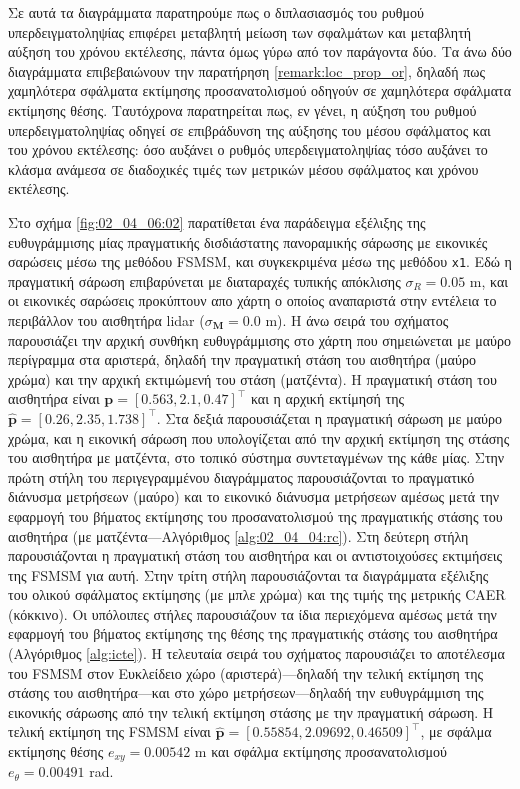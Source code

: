 Σε αυτά τα διαγράμματα παρατηρούμε πως ο διπλασιασμός του ρυθμού
υπερδειγματοληψίας επιφέρει μεταβλητή μείωση των σφαλμάτων και μεταβλητή αύξηση
του χρόνου εκτέλεσης, πάντα όμως γύρω από τον παράγοντα δύο. Τα άνω δύο
διαγράμματα επιβεβαιώνουν την παρατήρηση \ref{remark:loc_prop_or}, δηλαδή πως
χαμηλότερα σφάλματα εκτίμησης προσανατολισμού οδηγούν σε χαμηλότερα σφάλματα
εκτίμησης θέσης. Ταυτόχρονα παρατηρείται πως, εν γένει, η αύξηση του ρυθμού
υπερδειγματοληψίας οδηγεί σε επιβράδυνση της αύξησης του μέσου σφάλματος και
του χρόνου εκτέλεσης: όσο αυξάνει ο ρυθμός υπερδειγματοληψίας τόσο  αυξάνει το
κλάσμα ανάμεσα σε διαδοχικές τιμές των μετρικών μέσου σφάλματος και χρόνου
εκτέλεσης.


Στο σχήμα \ref{fig:02_04_06:02} παρατίθεται ένα παράδειγμα εξέλιξης της
ευθυγράμμισης μίας πραγματικής δισδιάστατης πανοραμικής σάρωσης με εικονικές
σαρώσεις μέσω της μεθόδου FSMSM, και συγκεκριμένα μέσω της μεθόδου \texttt{x1}.
Εδώ η πραγματική σάρωση επιβαρύνεται με διαταραχές τυπικής απόκλισης $\sigma_R
= 0.05$ m, και οι εικονικές σαρώσεις προκύπτουν απο χάρτη ο οποίος αναπαριστά
στην εντέλεια το περιβάλλον του αισθητήρα lidar ($\sigma_{\bm{M}} = 0.0$ m). Η
άνω σειρά του σχήματος παρουσιάζει την αρχική συνθήκη ευθυγράμμισης στο χάρτη
που σημειώνεται με μαύρο περίγραμμα στα αριστερά, δηλαδή την πραγματική στάση
του αισθητήρα (μαύρο χρώμα) και την αρχική εκτιμώμενή του στάση (ματζέντα). Η
πραγματική στάση του αισθητήρα είναι $\bm{p} = [0.563, 2.1, 0.47]^\top$ και η
αρχική εκτίμησή της $\hat{\bm{p}} = [0.26, 2.35, 1.738]^\top$. Στα δεξιά
παρουσιάζεται η πραγματική σάρωση με μαύρο χρώμα, και η εικονική σάρωση που
υπολογίζεται από την αρχική εκτίμηση της στάσης του αισθητήρα με ματζέντα, στο
τοπικό σύστημα συντεταγμένων της κάθε μίας. Στην πρώτη στήλη του
περιγεγραμμένου διαγράμματος παρουσιάζονται το πραγματικό διάνυσμα μετρήσεων
(μαύρο) και το εικονικό διάνυσμα μετρήσεων αμέσως μετά την εφαρμογή του βήματος
εκτίμησης του προσανατολισμού της πραγματικής στάσης του αισθητήρα (με
ματζέντα---Αλγόριθμος \ref{alg:02_04_04:rc}). Στη δεύτερη στήλη παρουσιάζονται
η πραγματική στάση του αισθητήρα και οι αντιστοιχούσες εκτιμήσεις της FSMSM για
αυτή. Στην τρίτη στήλη παρουσιάζονται τα διαγράμματα εξέλιξης του ολικού
σφάλματος εκτίμησης (με μπλε χρώμα) και της τιμής της μετρικής CAER (κόκκινο).
Οι υπόλοιπες στήλες παρουσιάζουν τα ίδια περιεχόμενα αμέσως μετά την εφαρμογή
του βήματος εκτίμησης της θέσης της πραγματικής στάσης του αισθητήρα
(Αλγόριθμος \ref{alg:icte}).  Η τελευταία σειρά του σχήματος παρουσιάζει το
αποτέλεσμα του FSMSM στον Ευκλείδειο χώρο (αριστερά)---δηλαδή την τελική
εκτίμηση της στάσης του αισθητήρα---και στο χώρο μετρήσεων---δηλαδή την
ευθυγράμμιση της εικονικής σάρωσης από την τελική εκτίμηση στάσης με την
πραγματική σάρωση. Η τελική εκτίμηση της FSMSM είναι $\hat{\bm{p}} = [0.55854,
2.09692, 0.46509]^\top$, με σφάλμα εκτίμησης θέσης $e_{xy} = 0.00542$ m και
σφάλμα εκτίμησης προσανατολισμού $e_{\theta} = 0.00491$ rad.

